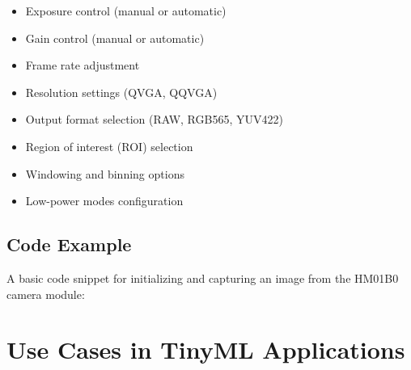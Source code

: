 \begin{itemize}
    
    
    
    \item Exposure control (manual or automatic)
    
    
    
    \item Gain control (manual or automatic)
    
    
    
    \item Frame rate adjustment
    
    
    
    \item Resolution settings (QVGA, QQVGA)
    
    
    
    \item Output format selection (RAW, RGB565, YUV422)
    
    
    
    \item Region of interest (ROI) selection
    
    
    
    \item Windowing and binning options
    
    
    
    \item Low-power modes configuration
    
    
    
\end{itemize}







\subsection{Code Example}



A basic code snippet for initializing and capturing an image from the HM01B0 camera module:


{
    \label{HM01B0:example}
}


\section{Use Cases in TinyML Applications}



